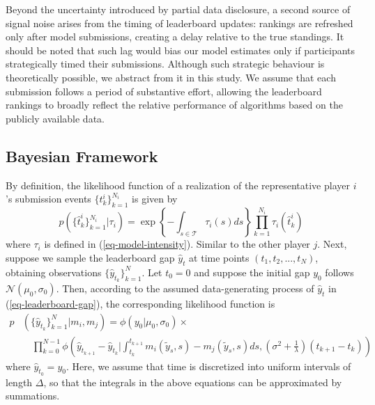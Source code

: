 \documentclass[mnsc]{informs3}
\begin{document}
Beyond the uncertainty introduced by partial data disclosure, a second source of signal noise arises from the timing of leaderboard updates: 
rankings are refreshed only after model submissions, creating a delay relative to the true standings.
It should be noted that such lag would bias our model estimates only if participants strategically timed their submissions.
Although such strategic behaviour is theoretically possible, we abstract from it in this study.
We assume that each submission follows a period of substantive effort, allowing the leaderboard rankings to broadly reflect the relative performance of algorithms based on the publicly available data.




\subsection{Bayesian Framework}

By definition, the likelihood function of a realization of the representative player $i$'s submission events $\{t^i_k\}_{k=1}^{N_i}$ is given by 
\begin{equation}\label{eq-ihpp-prob}
p\left(\{\hat{t}^i_k\}_{k=1}^{N_i} | \tau_i\right) = \exp\left\{-\int_{s\in\mathcal{T}}\tau_i(s)ds\right\}\prod_{k=1}^{N_i}\tau_i(\hat{t}^i_k)
\end{equation}
where $\tau_i$ is defined in (\ref{eq-model-intensity}). 
Similar to the other player $j$. 
Next, suppose we sample the leaderboard gap $\hat{y}_t$ at time points $(t_1, t_2, ..., t_N)$, obtaining observations $\{\hat{y}_{t_k}\}^N_{k=1}$. 
Let $t_0 = 0$ and suppose the initial gap $y_0$ follows $\mathcal{N}(\mu_0, \sigma_0)$. 
Then, according to the assumed data-generating process of $\hat{y}_t$ in (\ref{eq-leaderboard-gap}), the corresponding likelihood function is
\begin{equation}\label{eq-obs_gap-prob}
\begin{aligned}
p&\left(\{\hat{y}_{t_k}\}_{k=1}^N | m_i, m_j\right) = 
\phi\left(y_0 | \mu_0, \sigma_0\right) \times\\
&\quad\prod_{k=0}^{N-1}\phi\left(\hat{y}_{t_{k+1}}-\hat{y}_{t_k}|\int_{t_k}^{t_{k+1}}m_i(\tilde{y}_s, s) - m_j(\tilde{y}_s, s)ds, \left(\sigma^2+\frac{1}{\lambda}\right)(t_{k+1}-t_k)\right)
\end{aligned}
\end{equation}
where $\hat{y}_{t_0} = y_0$. 
Here, we assume that time is discretized into uniform intervals of length $\Delta$, so that the integrals in the above equations can be approximated by summations.
\end{document}
